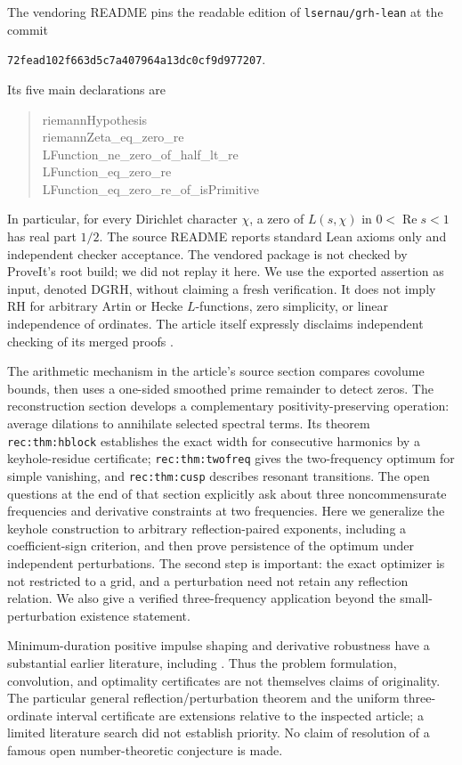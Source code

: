 \documentclass[11pt]{article}
\theoremstyle{remark}\newtheorem{remark}[theorem]{Remark}
\newcommand{\Rea}{\operatorname{Re}}\newcommand{\Ima}{\operatorname{Im}}\newcommand{\dd}{\,\mathrm d}
\begin{document}
The vendoring README pins the readable edition of \texttt{lsernau/grh-lean} at the commit
\begin{center}\small\texttt{72fead102f663d5c7a407964a13dc0cf9d977207}.\end{center}
Its five main declarations are
\begin{quote}\small\ttfamily
riemannHypothesis\\
riemannZeta\_eq\_zero\_re\\
LFunction\_ne\_zero\_of\_half\_lt\_re\\
LFunction\_eq\_zero\_re\\
LFunction\_eq\_zero\_re\_of\_isPrimitive
\end{quote} In particular, for every Dirichlet character $\chi$, a zero of $L(s,\chi)$ in $0<\Rea s<1$ has real part $1/2$. The source README reports standard Lean axioms only and independent checker acceptance. The vendored package is not checked by ProveIt's root build; we did not replay it here. We use the exported assertion as input, denoted DGRH, without claiming a fresh verification. It does not imply RH for arbitrary Artin or Hecke $L$-functions, zero simplicity, or linear independence of ordinates. The article itself expressly disclaims independent checking of its merged proofs \cite{vendor,article}.

The arithmetic mechanism in the article's source section compares covolume bounds, then uses a one-sided smoothed prime remainder to detect zeros. The reconstruction section develops a complementary positivity-preserving operation: average dilations to annihilate selected spectral terms. Its theorem \texttt{rec:thm:hblock} establishes the exact width for consecutive harmonics by a keyhole-residue certificate; \texttt{rec:thm:twofreq} gives the two-frequency optimum for simple vanishing, and \texttt{rec:thm:cusp} describes resonant transitions. The open questions at the end of that section explicitly ask about three noncommensurate frequencies and derivative constraints at two frequencies. Here we generalize the keyhole construction to arbitrary reflection-paired exponents, including a coefficient-sign criterion, and then prove persistence of the optimum under independent perturbations. The second step is important: the exact optimizer is not restricted to a grid, and a perturbation need not retain any reflection relation. We also give a verified three-frequency application beyond the small-perturbation existence statement.

Minimum-duration positive impulse shaping and derivative robustness have a substantial earlier literature, including \cite{lau,pao}. Thus the problem formulation, convolution, and optimality certificates are not themselves claims of originality. The particular general reflection/perturbation theorem and the uniform three-ordinate interval certificate are extensions relative to the inspected article; a limited literature search did not establish priority. No claim of resolution of a famous open number-theoretic conjecture is made.
\end{document}
